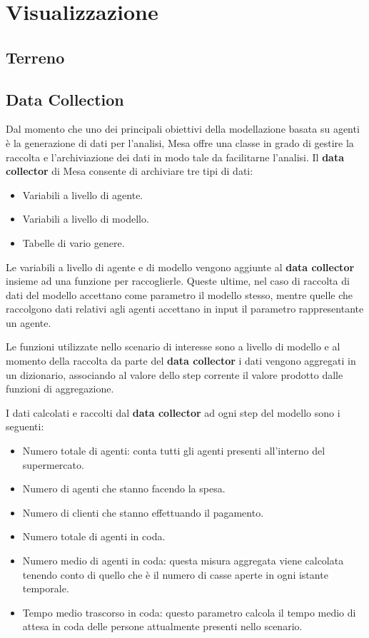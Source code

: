 \section{Visualizzazione}

\subsection{Terreno}

\subsection{Data Collection}\label{sec:data-col}

Dal momento che uno dei principali obiettivi della modellazione basata su agenti è la generazione di dati per l'analisi, Mesa offre una classe in grado di gestire la raccolta e l'archiviazione dei dati in modo tale da facilitarne l'analisi. Il \textbf{data collector} di Mesa consente di archiviare tre tipi di dati:

\begin{itemize}
    \item Variabili a livello di agente.
    \item Variabili a livello di modello.
    \item Tabelle di vario genere.
\end{itemize}

Le variabili a livello di agente e di modello vengono aggiunte al \textbf{data collector} insieme ad una funzione per raccoglierle. Queste ultime, nel caso di raccolta di dati del modello accettano come parametro il modello stesso, mentre quelle che raccolgono dati relativi agli agenti accettano in input il parametro rappresentante un agente.

Le funzioni utilizzate nello scenario di interesse sono a livello di modello e al momento della raccolta da parte del \textbf{data collector} i dati vengono aggregati in un dizionario, associando al valore dello step corrente il valore prodotto dalle funzioni di aggregazione.

I dati calcolati e raccolti dal \textbf{data collector} ad ogni step del modello sono i seguenti:

\begin{itemize}
    \item Numero totale di agenti: conta tutti gli agenti presenti all'interno del supermercato.
    \item Numero di agenti che stanno facendo la spesa.
    \item Numero di clienti che stanno effettuando il pagamento.
    \item Numero totale di agenti in coda.
    \item Numero medio di agenti in coda: questa misura aggregata viene calcolata tenendo conto di quello che è il numero di casse aperte in ogni istante temporale.
    \item Tempo medio trascorso in coda: questo parametro calcola il tempo medio di attesa in coda delle persone attualmente presenti nello scenario.
\end{itemize}

